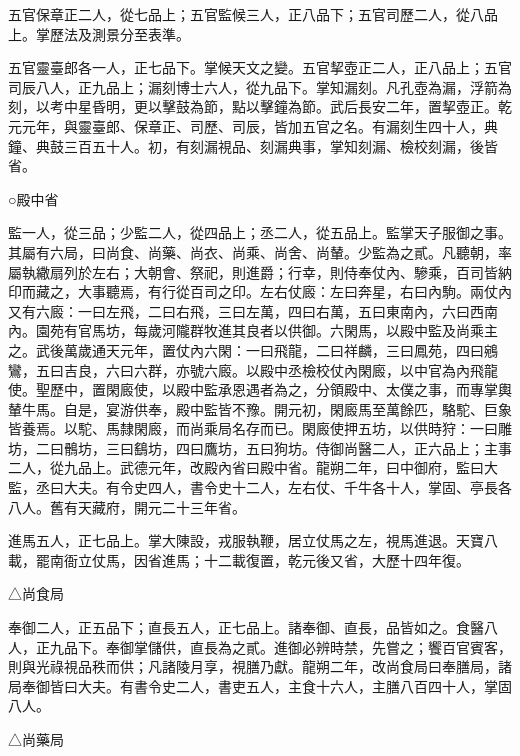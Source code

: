 \begin{pinyinscope}
 五官保章正二人，從七品上；五官監候三人，正八品下；五官司歷二人，從八品上。掌歷法及測景分至表準。



 五官靈臺郎各一人，正七品下。掌候天文之變。五官挈壺正二人，正八品上；五官司辰八人，正九品上；漏刻博士六人，從九品下。掌知漏刻。凡孔壺為漏，浮箭為刻，以考中星昏明，更以擊鼓為節，點以擊鐘為節。武后長安二年，置挈壺正。乾元元年，與靈臺郎、保章正、司歷、司辰，皆加五官之名。有漏刻生四十人，典鐘、典鼓三百五十人。初，有刻漏視品、刻漏典事，掌知刻漏、檢校刻漏，後皆省。



 ○殿中省



 監一人，從三品；少監二人，從四品上；丞二人，從五品上。監掌天子服御之事。其屬有六局，曰尚食、尚藥、尚衣、尚乘、尚舍、尚輦。少監為之貳。凡聽朝，率屬執繖扇列於左右；大朝會、祭祀，則進爵；行幸，則侍奉仗內、驂乘，百司皆納印而藏之，大事聽焉，有行從百司之印。左右仗廄：左曰奔星，右曰內駒。兩仗內又有六廄：一曰左飛，二曰右飛，三曰左萬，四曰右萬，五曰東南內，六曰西南內。園苑有官馬坊，每歲河隴群牧進其良者以供御。六閑馬，以殿中監及尚乘主之。武後萬歲通天元年，置仗內六閑：一曰飛龍，二曰祥麟，三曰鳳苑，四曰鵷鸞，五曰吉良，六曰六群，亦號六廄。以殿中丞檢校仗內閑廄，以中官為內飛龍使。聖歷中，置閑廄使，以殿中監承恩遇者為之，分領殿中、太僕之事，而專掌輿輦牛馬。自是，宴游供奉，殿中監皆不豫。開元初，閑廄馬至萬餘匹，駱駝、巨象皆養焉。以駝、馬隸閑廄，而尚乘局名存而已。閑廄使押五坊，以供時狩：一曰雕坊，二曰鶻坊，三曰鷂坊，四曰鷹坊，五曰狗坊。侍御尚醫二人，正六品上；主事二人，從九品上。武德元年，改殿內省曰殿中省。龍朔二年，曰中御府，監曰大監，丞曰大夫。有令史四人，書令史十二人，左右仗、千牛各十人，掌固、亭長各八人。舊有天藏府，開元二十三年省。



 進馬五人，正七品上。掌大陳設，戎服執鞭，居立仗馬之左，視馬進退。天寶八載，罷南衙立仗馬，因省進馬；十二載復置，乾元後又省，大歷十四年復。



 △尚食局



 奉御二人，正五品下；直長五人，正七品上。諸奉御、直長，品皆如之。食醫八人，正九品下。奉御掌儲供，直長為之貳。進御必辨時禁，先嘗之；饗百官賓客，則與光祿視品秩而供；凡諸陵月享，視膳乃獻。龍朔二年，改尚食局曰奉膳局，諸局奉御皆曰大夫。有書令史二人，書吏五人，主食十六人，主膳八百四十人，掌固八人。



 △尚藥局




\end{pinyinscope}
